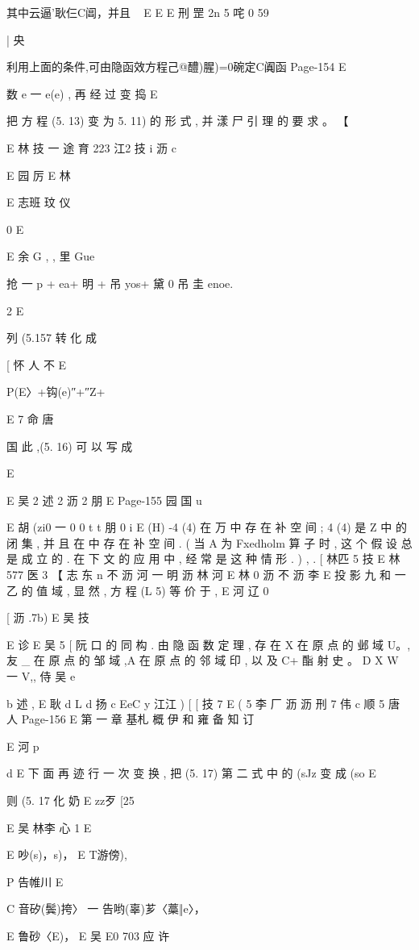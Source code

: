{{{{{{{{{{{{{{{其中云逼'耿仨C阊，并且
~ E E
E 刑 罡
2n 5 咤 0 59

|
央

利用上面的条件,可由隐函效方程己@醴)腥)=0碗定C阗函
Page-154
E

数 e 一 e(e) , 再 经 过 变 捣
E

把 方 程 (5. 13) 变 为 5. 11) 的 形 式 , 并 漾 尸 引 理 的 要 求 。 【

E 林 技 一 途 育 223 江2 技
i 沥 c

E 园 厉
E 林

E 志班 玟 仪

0
E

E
余 G , , 里 Gue
{抢 一 p + ea+ 明 + 吊 yos+ 黛 0 吊 圭 enoe.

2
E

列 (5.157 转 化 成

[ 怀 人 不
E {P(E〉+钩(e)″+″Z+

E
7 命 唐

国 此 ,(5. 16) 可 以 写 成

E

E 吴 2 述 2 沥 2 朋
E
Page-155
园 国 u

E
胡 (zi0 一 0 0
t t 朋
0 i
E
(H) -4 (4) 在 万 中 存 在 补 空 间 ; 4 (4) 是 Z 中 的 闭 集 , 并 且
在 中 存 在 补 空 间 . ( 当 A 为 Fxedholm 算 子 时 , 这 个 假 设 总 是 成 立
的 . 在 下 文 的 应 用 中 , 经 常 是 这 种 情 形 . ) , .
[ 林匹 5 技
E 林577 医 3
【 志 东 n 不 沥 河 一 明 沥 林 河
E 林 0 沥 不 沥 李 E
投 影 九 和 一 乙 的 值 域 , 显 然 , 方 程 (L 5) 等 价 于 ,
E 河 辽 0

[ 沥 .7b)
E 吴 技

E 诊
E 吴 5 [ 阮 口
的 同 构 . 由 隐 函 数 定 理 , 存 在 X 在 原 点 的 邺 域 U。, 友 _ 在 原 点 的
邹 域 ,A 在 原 点 的 邻 域 印 , 以 及 C+ 酯 射 史 。 D X W 一 V,, 侍
吴 e

b 述 ,
E 耿 d L d 扬
c
EeC y 江江 ) [
[ 技 7
E ( 5 李 厂 沥 沥 刑 7 伟 c 顺 5 唐 人
Page-156
E 第 一 章 基札 概 伊 和 雍 备 知 订

E 河 p

d
E
下 面 再 迹 行 一 次 变 换 , 把 (5. 17) 第 二 式 中 的 (sJz 变 成 (so
E

则 (5. 17 化 奶
E zz歹 [25

E 吴 林李 心
1
E

E 吵(s)，s)，
E T游傍),

P 告帷川 E

C 音矽(鬓)挎〉 一 告哟(辜)芗〈藁‖e〉，

E 鲁砂〈E)， E 吴
E0 703
应 许

}}}}}}}}}}}}}}}}}
